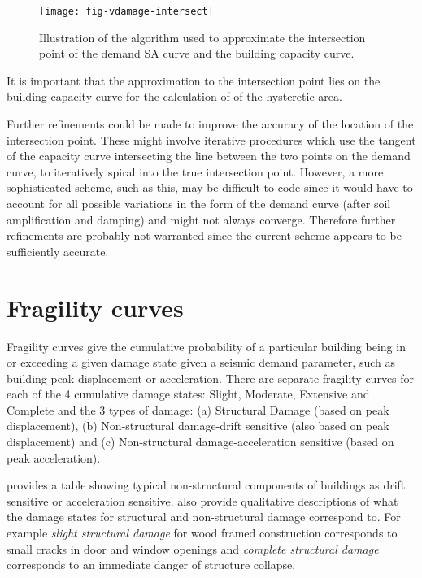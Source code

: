 \begin{figure}[htp]
\centering
\texttt{[image: fig-vdamage-intersect]}
\caption{Illustration of the algorithm used to approximate the
intersection point of the demand SA curve and the building
capacity curve.}
\label{fig:vdamage-intersection}
\end{figure}

It is important that the approximation to the intersection point
lies on the building capacity curve for the
calculation of of the hysteretic area.

Further refinements could be made to improve the accuracy of the
location of the intersection point. These might involve iterative
procedures which use the tangent of the capacity
curve intersecting the line between the two
points on the demand curve, to iteratively
spiral into the true intersection point. However, a more
sophisticated scheme, such as this, may be difficult to code since
it would have to account for all possible variations in the form
of the demand curve (after soil amplification
and damping) and might not always converge. Therefore further
refinements are probably not warranted since the current scheme
appears to be sufficiently accurate.






\section{Fragility curves}

Fragility curves give the cumulative probability of a particular
building being in or exceeding a given damage state given  a
seismic demand parameter, such as building peak
displacement or acceleration. There are
separate fragility curves for each of the
4 cumulative damage states: Slight, Moderate, Extensive and
Complete and the 3 types of damage: (a) Structural Damage (based
on peak displacement), (b) Non-structural
damage-drift sensitive (also based on peak displacement) and (c) Non-structural damage-acceleration
sensitive (based on peak acceleration).

\citet[page 5-12, Table 5.2]{dr_FEMA99b} provides a table showing
typical non-structural components of buildings as drift sensitive
or acceleration sensitive. \citet[page 5-13 to 5-23]{dr_FEMA99b}
also provide qualitative descriptions of what the damage states
for structural and non-structural damage correspond to. For
example \textit{slight structural damage} for wood framed
construction corresponds to small cracks in door and window
openings and \textit{complete structural damage} corresponds to an
immediate danger of structure collapse.

